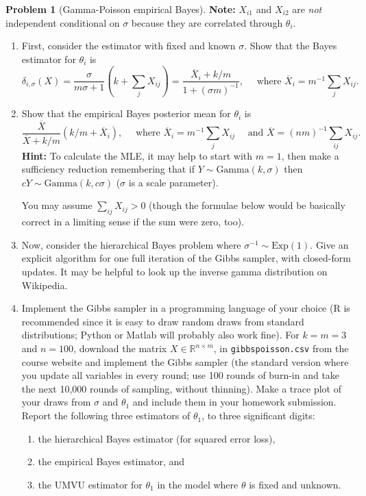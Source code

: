 \documentclass{article}
\newcommand{\RR}{\mathbb{R}}
\theoremstyle{definition}
\newtheorem{problem}{Problem}
\begin{document}
\begin{problem}[Gamma-Poisson empirical Bayes]
{\bf Note:} $X_{i1}$ and $X_{i2}$ are {\em not} independent conditional on $\sigma$ because they are correlated through $\theta_i$.


\begin{enumerate}[label=(\alph*)]

\item First, consider the estimator with fixed and known $\sigma$. Show that the Bayes estimator for $\theta_i$ is
\[
\delta_{i,\sigma}(X) = \frac{\sigma}{m\sigma + 1}\left(k+\sum_j X_{ij}\right) = \frac{\overline{X}_i + k/m}{1 + (\sigma m)^{-1}}, \quad \text{ where } \overline{X}_i = m^{-1}\sum_{j} X_{ij}.
\]




\item Show that the empirical Bayes posterior mean for $\theta_i$ is
\[
\frac{\overline X}{\overline{X} + k/m} (k/m + \overline{X}_i), \quad \text{ where } \overline{X}_i = m^{-1}\sum_{j} X_{ij} \quad \text{ and } \overline{X} = (nm)^{-1}\sum_{ij} X_{ij}.
\]
{\bf Hint:} To calculate the MLE, it may help to start with $m=1$, then make a sufficiency reduction remembering that if $Y\sim \text{Gamma}(k,\sigma)$ then $cY \sim \text{Gamma}(k,c\sigma)$ ($\sigma$ is a scale parameter).

You may assume $\sum_{ij} X_{ij} > 0$ (though the formulae below would be basically correct in a limiting sense if the sum were zero, too).



\item Now, consider the hierarchical Bayes problem where $\sigma^{-1}\sim \text{Exp}(1)$. Give an explicit algorithm for one full iteration of the Gibbs sampler, with closed-form updates. It may be helpful to look up the inverse gamma distribution on Wikipedia.





\item Implement the Gibbs sampler in a programming language of your choice (R is recommended since it is easy to draw random draws from standard distributions; Python or Matlab will probably also work fine). For $k=m=3$ and $n=100$, download the matrix $X \in \RR^{n \times m}$, in \texttt{gibbspoisson.csv} from the course website and implement the Gibbs sampler (the standard version where you update all variables in every round; use 100 rounds of burn-in and take the next 10,000 rounds of sampling, without thinning). Make a trace plot of your draws from $\sigma$ and $\theta_1$ and include them in your homework submission. Report the following three estimators of $\theta_1$, to three significant digits:
\begin{enumerate}[label=(\roman*)]
\item the hierarchical Bayes estimator (for squared error loss),
\item the empirical Bayes estimator, and
\item the UMVU estimator for $\theta_1$ in the model where $\theta$ is fixed and unknown.
\end{enumerate}




\end{enumerate}
\end{problem}
\end{document}
